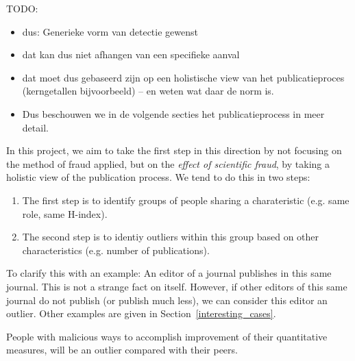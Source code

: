 \documentclass{ou-report}
\newcommand{\todo}[1]{{\color{red} TODO: #1}}
\begin{document}
\todo{
\begin{itemize}
    \item dus: Generieke vorm van detectie gewenst
    \item dat kan dus niet afhangen van een specifieke aanval
    \item dat moet dus gebaseerd zijn op een holistische view van het 
        publicatieproces (kerngetallen bijvoorbeeld)
        -- en weten wat daar de norm is.
    \item Dus beschouwen we in de volgende secties het publicatieprocess in meer 
        detail.
\end{itemize}
}

In this project, we aim to take the first step in this direction by not focusing 
on the method of fraud applied, but on the \emph{effect of scientific fraud}, by
taking a holistic view of the publication process. We tend to do this in two 
steps:
\begin{enumerate}
    \item The first step is to identify groups of people sharing a 
        charateristic (e.g. same role, same H-index).
    \item The second step is to identiy outliers within this group based on
        other characteristics (e.g. number of publications).
    
    

\end{enumerate}

To clarify this with an example: An editor of a journal publishes in this 
same journal. This is not a strange fact on itself. However, if other editors of
this same journal do not publish (or publish much less), we can consider this 
editor an outlier. Other examples are given in Section~\ref{interesting_cases}.

People with malicious ways to accomplish improvement of their quantitative 
measures, will be an outlier compared with their peers.
\end{document}
